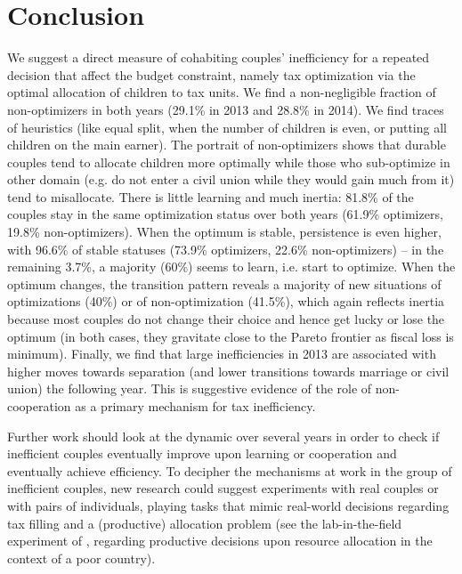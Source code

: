 \section{Conclusion}
We suggest a direct measure of cohabiting couples’ inefficiency for a repeated decision that affect the budget constraint, namely tax optimization via the optimal allocation of children to tax units. We find a non-negligible fraction of non-optimizers in both years (29.1\% in 2013 and 28.8\% in 2014). We find traces of heuristics (like equal split, when the number of children is even, or putting all children on the main earner). The portrait of non-optimizers shows that durable couples tend to allocate children more optimally while those who sub-optimize in other domain (e.g. do not enter a civil union while they would gain much from it) tend to misallocate. There is little learning and much inertia: 81.8\% of the couples stay in the same optimization status over both years (61.9\% optimizers, 19.8\% non-optimizers). When the optimum is stable, persistence is even higher, with 96.6\% of stable statuses (73.9\% optimizers, 22.6\% non-optimizers) – in the remaining 3.7\%, a majority (60\%) seems to learn, i.e. start to optimize. When the optimum changes, the transition pattern reveals a majority of new situations of optimizations (40\%) or of non-optimization (41.5\%), which again reflects inertia because most couples do not change their choice and hence get lucky or lose the optimum (in both cases, they gravitate close to the Pareto frontier as fiscal loss is minimum). Finally, we find that large inefficiencies in 2013 are associated with higher moves towards separation (and lower transitions towards marriage or civil union) the following year. This is suggestive evidence of the role of non-cooperation as a primary mechanism for tax inefficiency.

Further work should look at the dynamic over several years in order to check if inefficient couples eventually improve upon learning or cooperation and eventually achieve efficiency. To decipher the mechanisms at work in the group of inefficient couples, new research could suggest experiments with real couples or with pairs of individuals, playing tasks that mimic real-world decisions regarding tax filling and a (productive) allocation problem (see the lab-in-the-field experiment of \citet{apedo2017}
, regarding productive decisions upon resource allocation in the context of a poor country).



